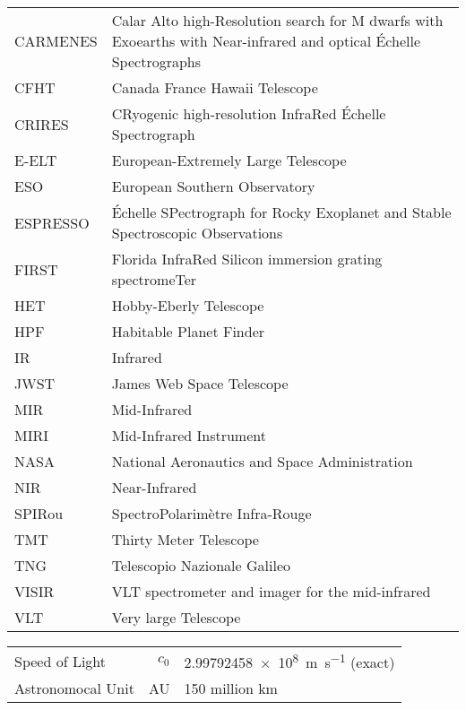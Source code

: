 \documentclass[fleqn]{fcup-thesis}
\begin{document}
\begin{preliminary}
\begin{abbreviations}
\begin{longtable}{ll}
				CARMENES & Calar Alto high-Resolution search for M dwarfs with Exoearths with Near-infrared and optical \'Echelle Spectrographs \\
				CFHT & Canada France Hawaii Telescope \\
				CRIRES & CRyogenic high-resolution InfraRed \'Echelle Spectrograph \\
				E-ELT & European-Extremely Large Telescope \\
				ESO & European Southern Observatory \\
				ESPRESSO & \'Echelle SPectrograph for Rocky Exoplanet and Stable Spectroscopic Observations\\
				FIRST & Florida InfraRed Silicon immersion grating spectromeTer \\
				HET & Hobby-Eberly Telescope \\
				HPF & Habitable Planet Finder \\
				IR & Infrared\\
				JWST & James Web Space Telescope \\
				MIR & Mid-Infrared \\
				MIRI & Mid-Infrared Instrument\\
				NASA & National Aeronautics and Space Administration \\
				NIR & Near-Infrared \\
				SPIRou & SpectroPolarim\`etre Infra-Rouge\\
				TMT & Thirty Meter Telescope\\
				TNG & Telescopio Nazionale Galileo \\
				VISIR &  VLT spectrometer and imager for the mid-infrared \\
				VLT & Very large Telescope \\
				
			\end{longtable}		
		\end{abbreviations}
		
		\begin{constants}
			\begin{longtable}{lr@{${}={}$}l}
				 
				 Speed of Light & $c_{0}$ & \SI{2.99792458e8}{\meter\per\second} (exact)\\
				 Astronomocal Unit & AU & 150 million km\\
			\end{longtable}
		\end{constants}
		

\end{preliminary}
\end{document}

